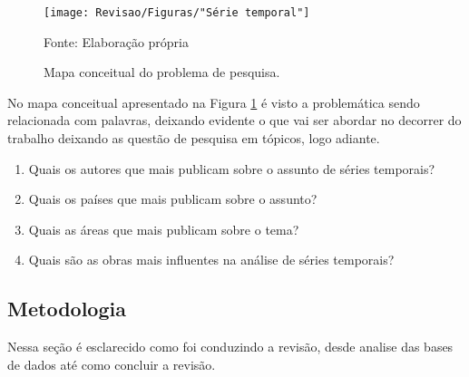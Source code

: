 \begin{figure}[H]
	\centering
	\caption{Mapa conceitual do problema de pesquisa.}
	\label{fig:serie-temporal}
	\texttt{[image: Revisao/Figuras/"Série temporal"]}
	
	Fonte: Elaboração própria 
\end{figure}

No mapa conceitual apresentado na Figura \ref{fig:serie-temporal} é visto a problemática sendo relacionada com palavras, deixando evidente o que vai ser abordar no decorrer do trabalho deixando as questão de pesquisa em tópicos, logo adiante.

\begin{enumerate}[start=1, label = {\textbf{Q} \arabic* } ]
	\item \label{questão:rev1}Quais os autores que mais publicam sobre o assunto de séries temporais?
	\item \label{questão:rev2}Quais os países que mais publicam sobre o assunto? 
	\item \label{questão:rev3}Quais as áreas que mais publicam sobre o tema?
	\item \label{questão:rev4}Quais são as obras mais influentes na análise de séries temporais?
\end{enumerate}

\subsection{Metodologia}\label{subsec:met da revisão}

Nessa seção é esclarecido como foi conduzindo a revisão, desde analise das bases de dados até como concluir a revisão.

